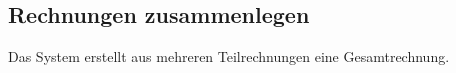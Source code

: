 \documentclass[../SubfileFeatures.tex]{subfiles}
\begin{document}
    \subsection{Rechnungen zusammenlegen}
    Das System erstellt aus mehreren Teilrechnungen eine Gesamtrechnung.
\end{document}
